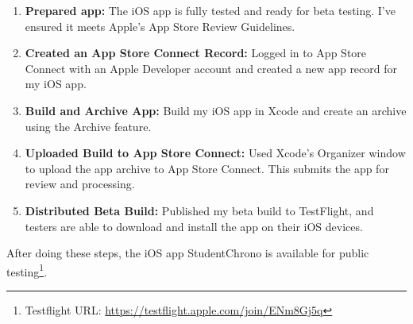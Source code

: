 \documentclass[
  biblatex = false,
  language=english,
  figures=false,
  sourcecodes,
  glossaries,
  index
]{kidiplom}
\begin{document}
\begin{enumerate}
    \item \textbf{Prepared app:} The iOS app is fully tested and ready for beta testing. I've ensured it meets Apple's App Store Review Guidelines.
    \item \textbf{Created an App Store Connect Record:} Logged in to App Store Connect with an Apple Developer account and created a new app record for my iOS app.
    \item \textbf{Build and Archive App:} Build my iOS app in Xcode and create an archive using the Archive feature.    
    \item \textbf{Uploaded Build to App Store Connect:} Used Xcode's Organizer window to upload the app archive to App Store Connect. This submits the app for review and processing.
    \item \textbf{Distributed Beta Build:} Published my beta build to TestFlight, and testers are able to download and install the app on their iOS devices.
 \end{enumerate}
 
After doing these steps, the iOS app StudentChrono is available for public testing\footnote{Testflight URL: \url{https://testflight.apple.com/join/ENm8Gj5q}}.
\end{document}
